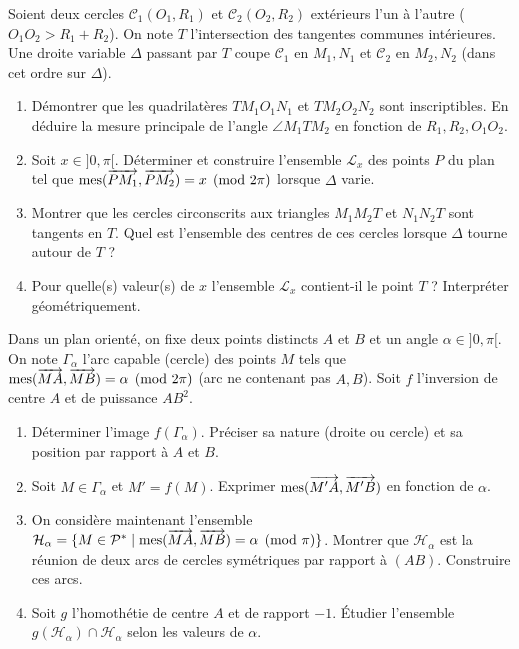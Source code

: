 \documentclass[11pt]{article}
\begin{document}
\begin{exercice}
Soient deux cercles $\mathcal{C}_1(O_1, R_1)$ et $\mathcal{C}_2(O_2, R_2)$ extérieurs l'un à l'autre ($O_1O_2 > R_1+R_2$). On note $T$ l'intersection des tangentes communes intérieures. Une droite variable $\Delta$ passant par $T$ coupe $\mathcal{C}_1$ en $M_1, N_1$ et $\mathcal{C}_2$ en $M_2, N_2$ (dans cet ordre sur $\Delta$).
\begin{enumerate}
    \item Démontrer que les quadrilatères $TM_1O_1N_1$ et $TM_2O_2N_2$ sont inscriptibles. En déduire la mesure principale de l'angle $\angle M_1TM_2$ en fonction de $R_1, R_2, O_1O_2$.
    \item Soit $x \in ]0, \pi[$. Déterminer et construire l'ensemble $\mathcal{L}_x$ des points $P$ du plan tel que $\mathop{\mathrm{mes}}\nolimits(\overrightarrow{PM_1},\overrightarrow{PM_2}) = x \pmod{2\pi}$ lorsque $\Delta$ varie.
    \item Montrer que les cercles circonscrits aux triangles $M_1M_2T$ et $N_1N_2T$ sont tangents en $T$. Quel est l'ensemble des centres de ces cercles lorsque $\Delta$ tourne autour de $T$ ?
    \item Pour quelle(s) valeur(s) de $x$ l'ensemble $\mathcal{L}_x$ contient-il le point $T$ ? Interpréter géométriquement.
\end{enumerate}
\end{exercice}

\begin{exercice}
Dans un plan orienté, on fixe deux points distincts $A$ et $B$ et un angle $\alpha \in ]0, \pi[$. On note $\Gamma_\alpha$ l'arc capable (cercle) des points $M$ tels que $\mathop{\mathrm{mes}}\nolimits(\overrightarrow{MA},\overrightarrow{MB}) = \alpha \pmod{2\pi}$ (arc ne contenant pas $A,B$). Soit $f$ l'inversion de centre $A$ et de puissance $AB^2$.
\begin{enumerate}
    \item Déterminer l'image $f(\Gamma_\alpha)$. Préciser sa nature (droite ou cercle) et sa position par rapport à $A$ et $B$.
    \item Soit $M \in \Gamma_\alpha$ et $M' = f(M)$. Exprimer $\mathop{\mathrm{mes}}\nolimits(\overrightarrow{M'A},\overrightarrow{M'B})$ en fonction de $\alpha$.
    \item On considère maintenant l'ensemble $\mathcal{H}_\alpha = \{ M \in \mathcal{P}^* \mid \mathop{\mathrm{mes}}\nolimits(\overrightarrow{MA},\overrightarrow{MB}) = \alpha \pmod{\pi} \}$.
    Montrer que $\mathcal{H}_\alpha$ est la réunion de deux arcs de cercles symétriques par rapport à $(AB)$. Construire ces arcs.
    \item Soit $g$ l'homothétie de centre $A$ et de rapport $-1$. Étudier l'ensemble $g(\mathcal{H}_\alpha) \cap \mathcal{H}_\alpha$ selon les valeurs de $\alpha$.
\end{enumerate}
\end{exercice}
\end{document}

